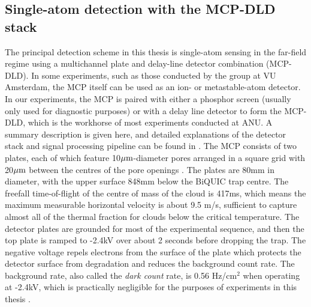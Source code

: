 \subsection*{Single-atom detection with the MCP-DLD stack}
	\label{sec:DLD}
	The principal detection scheme in this thesis is single-atom sensing in the far-field regime using a multichannel plate and delay-line detector combination (MCP-DLD).
	In some experiments, such as those conducted by the \mhe group at VU Amsterdam, the MCP itself can be used as an ion- or metastable-atom detector.
	In our experiments, the MCP is paired with either a phosphor screen (usually only used for diagnostic purposes) or with a delay line detector to form the MCP-DLD, which is the workhorse of most experiments conducted at ANU.
	A summary description is given here, and detailed explanations of the detector stack and signal processing pipeline can be found in \cite{ShinThesis, HodgmanThesis, ManningThesis}.
	The MCP consists of two plates, each of which feature 10$\mu\textrm{m}$-diameter pores arranged in a square grid with 20$\mu\textrm{m}$ between the centres of the pore openings .
	The plates are 80mm in diameter, with the upper surface 848mm below the BiQUIC trap centre.
	The freefall time-of-flight of the centre of mass of the cloud is 417ms, which means the maximum measurable horizontal velocity is about 9.5 m/s, sufficient to capture almost all of the thermal fraction for clouds below the critical temperature.
	The detector plates are grounded for most of the experimental sequence, and then the top plate is ramped to -2.4kV over about 2 seconds before dropping the trap.
	The negative voltage repels electrons from the surface of the plate which protects the detector surface from degradation and reduces the background count rate.
	The background rate, also called the \emph{dark count} rate, is 0.56 Hz/cm$^2$ when operating at -2.4kV, which is practically negligible for the purposes of experiments in this thesis .
	

